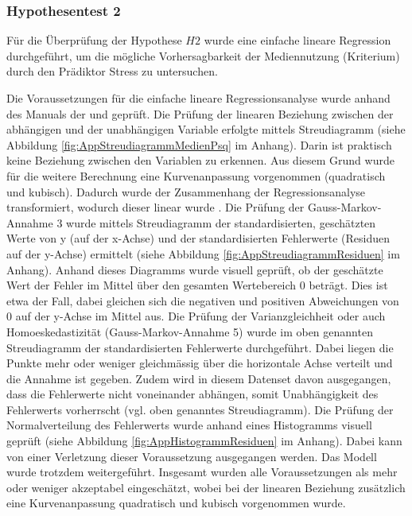 \subsubsection{Hypothesentest 2}
Für die Überprüfung der Hypothese $H2$ wurde eine einfache lineare Regression durchgeführt, um die mögliche Vorhersagbarkeit der Mediennutzung (Kriterium) durch den Prädiktor Stress zu untersuchen.

Die Voraussetzungen für die einfache lineare Regressionsanalyse wurde anhand des Manuals der  und  geprüft. Die Prüfung der linearen Beziehung zwischen der abhängigen und der unabhängigen Variable erfolgte mittels Streudiagramm (siehe Abbildung \ref{fig:AppStreudiagrammMedienPsq} im Anhang). Darin ist praktisch keine Beziehung zwischen den Variablen zu erkennen. Aus diesem Grund wurde für die weitere Berechnung eine Kurvenanpassung vorgenommen (quadratisch und kubisch). Dadurch wurde der Zusammenhang der Regressionsanalyse transformiert, wodurch dieser linear wurde \cite{UniversitatZurich2018}. Die Prüfung der Gauss-Markov-Annahme 3 \cite{UniversitatZurich2018} wurde mittels Streudiagramm der standardisierten, geschätzten Werte von y (auf der x-Achse) und der standardisierten Fehlerwerte (Residuen auf der y-Achse) ermittelt (siehe  Abbildung \ref{fig:AppStreudiagrammResiduen} im Anhang). Anhand dieses Diagramms wurde visuell geprüft, ob  der geschätzte Wert der Fehler im Mittel über den gesamten Wertebereich 0 beträgt. Dies ist etwa der Fall, dabei gleichen sich die negativen und positiven Abweichungen von 0 auf der y-Achse im Mittel aus. Die Prüfung der Varianzgleichheit oder auch Homoeskedastizität (Gauss-Markov-Annahme 5) wurde im oben genannten Streudiagramm der standardisierten Fehlerwerte durchgeführt. Dabei liegen die Punkte mehr oder weniger gleichmässig über die horizontale Achse verteilt und die Annahme ist gegeben. Zudem wird in diesem Datenset davon ausgegangen, dass die Fehlerwerte nicht voneinander abhängen, somit Unabhängigkeit des Fehlerwerts vorherrscht (vgl. oben genanntes Streudiagramm). Die Prüfung der Normalverteilung des Fehlerwerts wurde anhand eines Histogramms visuell geprüft (siehe Abbildung \ref{fig:AppHistogrammResiduen} im Anhang). Dabei kann von einer Verletzung dieser Voraussetzung ausgegangen werden. Das Modell wurde trotzdem weitergeführt. Insgesamt wurden alle Voraussetzungen als mehr oder weniger akzeptabel eingeschätzt, wobei bei der linearen Beziehung zusätzlich eine Kurvenanpassung quadratisch und kubisch vorgenommen wurde.

